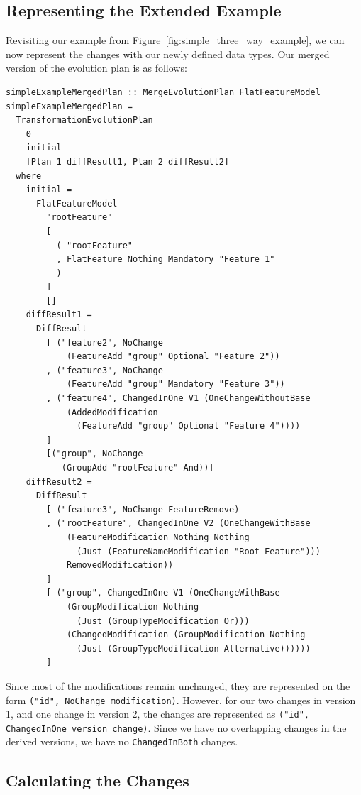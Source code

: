 \documentclass[a4paper,english]{ifimaster}
\begin{document}
\subsection{Representing the Extended Example}%
\label{sub:representing_the_extended_example}

Revisiting our example from Figure~\ref{fig:simple_three_way_example}, we can now represent the changes with our newly defined data types. Our merged version of the evolution plan is as follows:

\begin{verbatim}
simpleExampleMergedPlan :: MergeEvolutionPlan FlatFeatureModel
simpleExampleMergedPlan =
  TransformationEvolutionPlan
    0
    initial
    [Plan 1 diffResult1, Plan 2 diffResult2]
  where
    initial =
      FlatFeatureModel
        "rootFeature"
        [
          ( "rootFeature"
          , FlatFeature Nothing Mandatory "Feature 1"
          )
        ]
        []
    diffResult1 =
      DiffResult
        [ ("feature2", NoChange 
            (FeatureAdd "group" Optional "Feature 2"))
        , ("feature3", NoChange
            (FeatureAdd "group" Mandatory "Feature 3"))
        , ("feature4", ChangedInOne V1 (OneChangeWithoutBase 
            (AddedModification 
              (FeatureAdd "group" Optional "Feature 4"))))
        ]
        [("group", NoChange 
           (GroupAdd "rootFeature" And))]
    diffResult2 =
      DiffResult
        [ ("feature3", NoChange FeatureRemove)
        , ("rootFeature", ChangedInOne V2 (OneChangeWithBase 
            (FeatureModification Nothing Nothing 
              (Just (FeatureNameModification "Root Feature"))) 
            RemovedModification))
        ]
        [ ("group", ChangedInOne V1 (OneChangeWithBase 
            (GroupModification Nothing 
              (Just (GroupTypeModification Or))) 
            (ChangedModification (GroupModification Nothing 
              (Just (GroupTypeModification Alternative))))))
        ]
\end{verbatim}

Since most of the modifications remain unchanged, they are represented on the form \texttt{("id", NoChange modification)}. However, for our two changes in version 1, and one change in version 2, the changes are represented as \texttt{("id", ChangedInOne version change)}. Since we have no overlapping changes in the derived versions, we have no \texttt{ChangedInBoth} changes.

\subsection{Calculating the Changes}%
\label{sub:calculating_the_changes}
\end{document}
